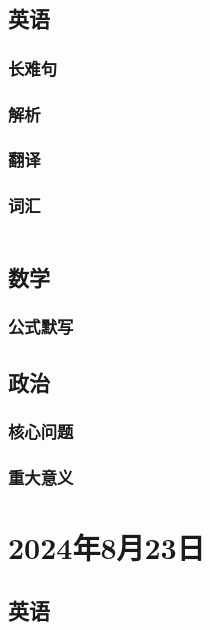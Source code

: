 \documentclass[UTF8]{ctexart}
\begin{document}
\subsection{英语}
\subsubsection{长难句}
\subsubsection{解析}
\subsubsection{翻译}
\subsubsection{词汇}\begin{table}[h]
      \centering
      \begin{tabular}{p{}p{}}
      \end{tabular}
\end{table}
\subsection{数学}
\subsubsection{公式默写}
\begin{multicols}{2}
\end{multicols}
\subsection{政治}
\subsubsection{}
\subsubsection{核心问题}
\subsubsection{重大意义}
\section{2024年8月23日}
\subsection{英语}
\end{document}
